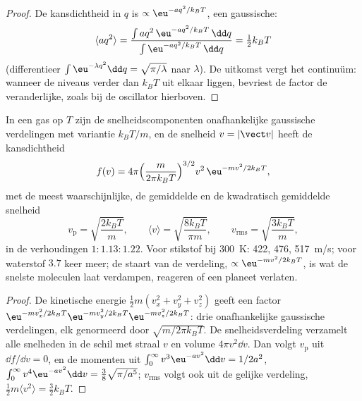 \begin{proof}
De kansdichtheid in $q$ is $\propto\eu^{-aq^2/k_BT}$, een gaussische:
\[
\langle aq^2\rangle = \frac{\int aq^2\,\eu^{-aq^2/k_BT}\,\dd q}{\int\eu^{-aq^2/k_BT}\,\dd q} = \tfrac12k_BT
\]
(differentieer $\int\eu^{-\lambda q^2}\dd q = \sqrt{\pi/\lambda}$ naar
$\lambda$). De uitkomst vergt het continuüm: wanneer de
niveaus verder dan $k_BT$ uit elkaar liggen, bevriest de factor de veranderlijke,
zoals bij de oscillator hierboven.
\end{proof}

\begin{theorem}\label{thm:b2:boltzmann-factor:maxwell}
In een gas op $T$ zijn de snelheidscomponenten onafhankelijke gaussische
verdelingen met
variantie $k_BT/m$, en de snelheid $v = |\vect v|$ heeft de kans\-dichtheid
\[
f(v) = 4\pi\Big(\frac{m}{2\pi k_BT}\Big)^{3/2}v^2\,\eu^{-mv^2/2k_BT} ,
\]
met de meest waarschijnlijke, de gemiddelde en de kwadratisch gemiddelde snelheid
\[
v_{\text{p}} = \sqrt{\frac{2k_BT}{m}}, \qquad
\langle v\rangle = \sqrt{\frac{8k_BT}{\pi m}}, \qquad
v_{\text{rms}} = \sqrt{\frac{3k_BT}{m}} ,
\]
in de verhoudingen $1 : 1.13 : 1.22$. Voor stikstof bij \qty{300}{K}: \qty{422}{},
\qty{476}{}, \qty{517}{m/s}; voor waterstof $3.7$ keer meer; de
staart van de verdeling, $\propto\eu^{-mv^2/2k_BT}$, is wat de
snelste moleculen laat verdampen, reageren of een planeet verlaten.
\end{theorem}

\begin{proof}
De kinetische energie $\tfrac12m(v_x^2 + v_y^2 + v_z^2)$ geeft een factor
$\eu^{-mv_x^2/2k_BT}\eu^{-mv_y^2/2k_BT}\eu^{-mv_z^2/2k_BT}$: drie onafhankelijke
gaussische verdelingen, elk genormeerd door $\sqrt{m/2\pi k_BT}$. De
snelheidsverdeling verzamelt alle snelheden in de schil met straal $v$ en
volume $4\pi v^2\dd v$. Dan volgt $v_{\text{p}}$ uit $\dd f/\dd v = 0$, en de
momenten uit $\int_0^\infty v^3\eu^{-av^2}\dd v = 1/2a^2$,
$\int_0^\infty
v^4\eu^{-av^2}\dd v = \tfrac38\sqrt{\pi/a^5}$;
$v_{\text{rms}}$ volgt ook
uit de gelijke verdeling, $\tfrac12m\langle v^2\rangle = \tfrac32k_BT$.
\end{proof}

